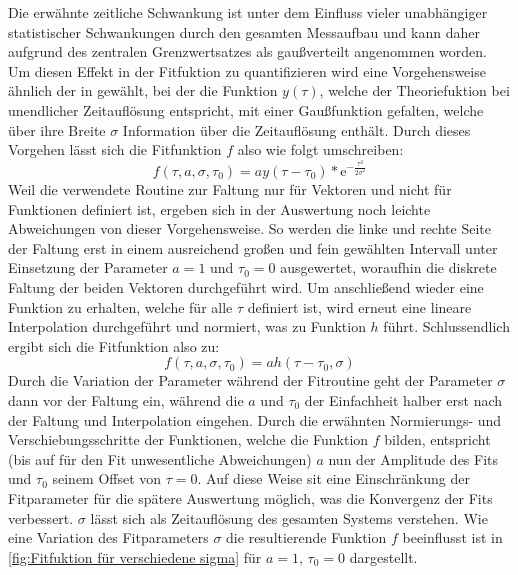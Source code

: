 Die erwähnte zeitliche Schwankung ist unter dem Einfluss vieler unabhängiger statistischer Schwankungen durch den gesamten Messaufbau und kann daher aufgrund des zentralen Grenzwertsatzes als gaußverteilt angenommen worden. 
Um diesen Effekt in der Fitfuktion zu quantifizieren wird eine Vorgehensweise ähnlich der in \cite{lasseguesFieldIntensityCorrelations2022} gewählt, bei der die Funktion $y(\tau)$, welche der Theoriefuktion bei unendlicher Zeitauflösung entspricht, mit einer Gaußfunktion gefalten, welche über ihre Breite $\sigma$ Information über die Zeitauflösung enthält. 
Durch dieses Vorgehen lässt sich die Fitfunktion $f$ also wie folgt umschreiben:
\begin{equation}
    f(\tau, a, \sigma, \tau_0) = ay(\tau - \tau_0) * \mathrm{e}^{-\frac{\tau^2}{2\sigma^2}}
\end{equation}
Weil die verwendete Routine zur Faltung nur für Vektoren und nicht für Funktionen definiert ist, ergeben sich in der Auswertung noch leichte Abweichungen von dieser Vorgehensweise. 
So werden die linke und rechte Seite der Faltung erst in einem ausreichend großen und fein gewählten Intervall unter Einsetzung der Parameter $a=1$ und $\tau_0 = 0$ ausgewertet, woraufhin die diskrete Faltung der beiden Vektoren durchgeführt wird. 
Um anschließend wieder eine Funktion zu erhalten, welche für alle $\tau$ definiert ist, wird erneut eine lineare Interpolation durchgeführt und normiert, was zu Funktion $h$ führt. 
Schlussendlich ergibt sich die Fitfunktion also zu:
\begin{equation}
    f(\tau, a, \sigma, \tau_0) = ah(\tau- \tau_0, \sigma)
\end{equation} 
Durch die Variation der Parameter während der Fitroutine geht der Parameter $\sigma$ dann vor der Faltung ein, während die $a$ und $\tau_0$ der Einfachheit halber erst nach der Faltung und Interpolation eingehen. 
Durch die erwähnten Normierungs- und Verschiebungsschritte der Funktionen, welche die Funktion $f$ bilden, entspricht (bis auf für den Fit unwesentliche Abweichungen) $a$ nun der Amplitude des Fits und $\tau_0$ seinem Offset von $\tau=0$. 
Auf diese Weise sit eine Einschränkung der Fitparameter für die spätere Auswertung möglich, was die Konvergenz der Fits verbessert. 
$\sigma$ lässt sich als Zeitauflösung des gesamten Systems verstehen. 
Wie eine Variation des Fitparameters $\sigma$ die resultierende Funktion $f$ beeinflusst ist in \autoref{fig:Fitfuktion für verschiedene sigma} für $a=1$, $\tau_0=0$ dargestellt. 
